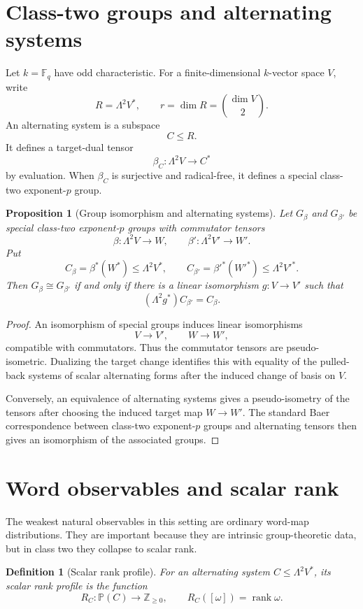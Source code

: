 \documentclass[11pt]{article}
\newtheorem{proposition}[theorem]{Proposition}
\newtheorem{definition}[theorem]{Definition}
\begin{document}
\section{Class-two groups and alternating systems}

Let $k=\mathbb F_q$ have odd characteristic. For a finite-dimensional $k$-vector space $V$, write
\[
R=\Lambda^2V^*,
\qquad r=\dim R=\binom{\dim V}{2}.
\]
An alternating system is a subspace
\[
C\le R.
\]
It defines a target-dual tensor
\[
\beta_C:\Lambda^2V\to C^*
\]
by evaluation. When $\beta_C$ is surjective and radical-free, it defines a special class-two exponent-$p$ group.

\begin{proposition}[Group isomorphism and alternating systems]
Let $G_\beta$ and $G_{\beta'}$ be special class-two exponent-$p$ groups with commutator tensors
\[
\beta:\Lambda^2V\to W,
\qquad
\beta':\Lambda^2V'\to W'.
\]
Put
\[
C_\beta=\beta^*(W^*)\le \Lambda^2V^*,
\qquad
C_{\beta'}=\beta'^*(W'^*)\le \Lambda^2V'^*.
\]
Then $G_\beta\cong G_{\beta'}$ if and only if there is a linear isomorphism $g:V\to V'$ such that
\[
(\Lambda^2g^*)C_{\beta'}=C_\beta.
\]
\end{proposition}

\begin{proof}
An isomorphism of special groups induces linear isomorphisms
\[
V\to V',
\qquad
W\to W',
\]
compatible with commutators. Thus the commutator tensors are pseudo-isometric. Dualizing the target change identifies this with equality of the pulled-back systems of scalar alternating forms after the induced change of basis on $V$.

Conversely, an equivalence of alternating systems gives a pseudo-isometry of the tensors after choosing the induced target map $W\to W'$. The standard Baer correspondence between class-two exponent-$p$ groups and alternating tensors then gives an isomorphism of the associated groups.
\end{proof}

\section{Word observables and scalar rank}

The weakest natural observables in this setting are ordinary word-map distributions. They are important because they are intrinsic group-theoretic data, but in class two they collapse to scalar rank.

\begin{definition}[Scalar rank profile]
For an alternating system $C\le\Lambda^2V^*$, its scalar rank profile is the function
\[
R_C:\mathbb P(C)\to \mathbb Z_{\ge0},
\qquad
R_C([\omega])=\operatorname{rank}\omega.
\]
\end{definition}
\end{document}
